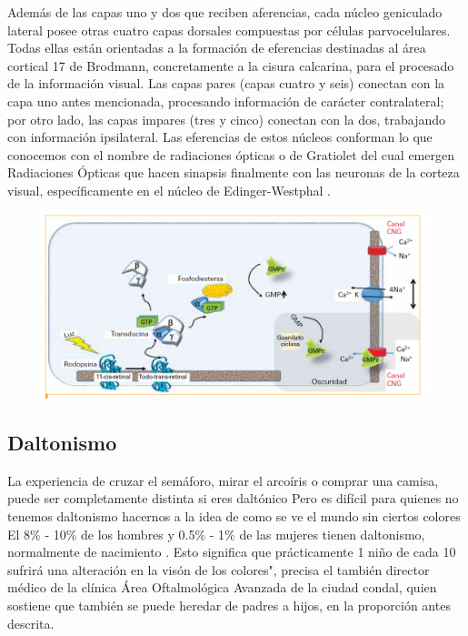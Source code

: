 \documentclass[10pt]{article}
\begin{document}
Además de las capas uno y dos que reciben aferencias, cada núcleo geniculado lateral posee otras cuatro capas dorsales compuestas por células parvocelulares. Todas ellas están orientadas a la formación de eferencias destinadas al área cortical 17 de Brodmann, concretamente a la cisura calcarina, para el procesado de la información visual. Las capas pares (capas cuatro y seis) conectan con la capa uno antes mencionada, procesando información de carácter contralateral; por otro lado, las capas impares (tres y cinco) conectan con la dos, trabajando con información ipsilateral. Las eferencias de estos núcleos conforman lo que conocemos con el nombre de radiaciones ópticas o de Gratiolet\cite{IEEEreferencias:Ref15} del cual emergen Radiaciones Ópticas que hacen sinapsis finalmente con las neuronas de la corteza visual, específicamente en el núcleo de Edinger-Westphal \cite{IEEEreferencias:Ref14}.

\setlength{\parskip}{2mm}

\begin{figure}[H]
	\begin{center}
\includegraphics[scale = 0.52]{Imagenes/cascada.png}
	\end{center} 
\end{figure}

\subsection{Daltonismo}

La experiencia de cruzar el semáforo, mirar el arcoíris o comprar una camisa, puede ser completamente distinta si eres daltónico
Pero es difícil para quienes no tenemos daltonismo hacernos a la idea de como se ve el mundo sin ciertos colores
El 8\% - 10\% de los hombres y 0.5\% - 1\% de las mujeres tienen daltonismo, normalmente de nacimiento \cite{IEEEreferencias:Ref25}\cite{IEEEreferencias:Ref26}.
Esto significa que prácticamente 1 niño de cada 10 sufrirá una alteración en la visón de los colores", precisa el también director médico de la clínica Área Oftalmológica Avanzada de la ciudad condal, quien sostiene que también se puede heredar de padres a hijos, en la proporción antes descrita\cite{IEEEreferencias:Ref26}.
\end{document}
